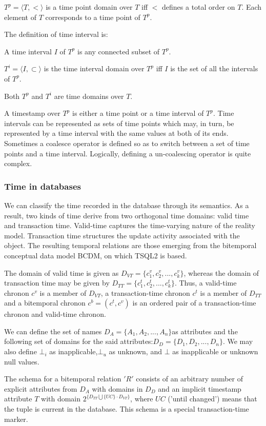 $T^p=\langle T,< \rangle$ is a time point domain over $T$ iff $<$ defines a total order on $T$. Each element of $T$ corresponds to a time point of $T^p$.

The definition of time interval is:

A time interval $I$ of $T^p$ is any connected subset of $T^p$.

$T^i = \langle I,\subset \rangle $ is the time interval domain over $T^p$ iff $I$ is the set of all the intervals of $T^p$.

Both $T^p$ and $T^i$ are time domains over $T$.

A timestamp over $T^p$ is either a time point or a time interval of $T^p$. Time intervals can be represented as sets of time points which may, in turn, be represented by a time interval with the same values at both of its ends. Sometimes a coalesce operator is defined so as to switch between a set of time points and a time interval. Logically, defining a un-coalescing operator is quite complex. 
\subsubsection{\label{subsubsec:timeDb}Time in databases}
We can classify the time recorded in the database through its semantics. As a result, two kinds of time derive from two orthogonal time domains: valid time and transaction time. Valid-time captures the time-varying nature of the reality model. Transaction time structures the update activity associated with the object. The resulting temporal relations are those emerging from the bitemporal conceptual data model BCDM, on which TSQL2 is based.

The domain of valid time is given as $D_{VT}=\lbrace{c_1^v,c_2^v,...,c_k^v}\rbrace$, whereas the domain of transaction time may be given by $D_{TT}=\lbrace{c_1^t,c_2^t,...,c_k^t}\rbrace$. Thus, a valid-time chronon $c^v$  is a member of $D_{VT}$, a transaction-time chronon $c^t$ is a member of $D_{TT}$ and a bitemporal chronon $c^b=(c^t,c^v)$ is an ordered pair of a transaction-time chronon and valid-time chronon.

We can define the set of names $D_A=\lbrace{A_1,A_2,...,A_n}\rbrace$as attributes and the following set of domains for the said attributes:$D_D=\lbrace{D_1,D_2,...,D_n}\rbrace$. We may also define $\bot_i$ as inapplicable,$\bot_u$ as unknown, and $\bot$ as inapplicable or unknown null values. 

The schema for a bitemporal relation $'R'$ consists of an arbitrary number of explicit attributes from $D_A$ with domains in $D_D$ and an implicit timestamp attribute $T$ with domain $2^{\lbrace D_{TT}\bigcup \lbrace UC \rbrace \cdot D_{VT}\rbrace}$, where $UC$ ('until changed') means that the tuple is current in the database. This schema is a special transaction-time marker.

